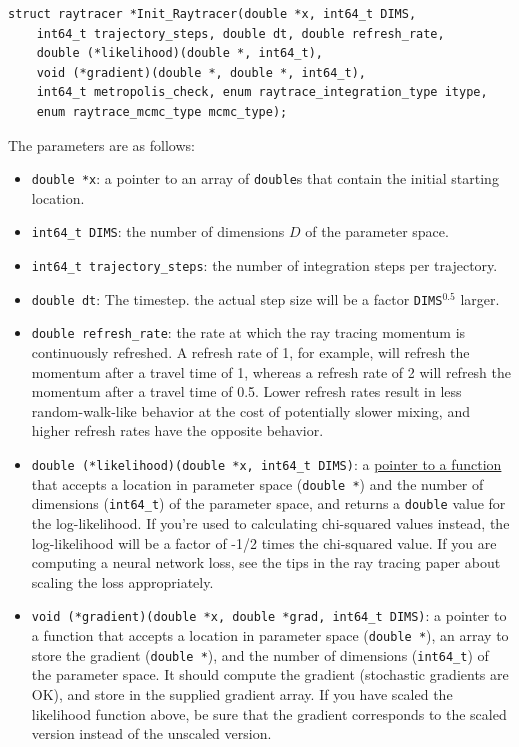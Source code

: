 \documentclass[12pt]{article}
\begin{document}
\begin{lstlisting}
struct raytracer *Init_Raytracer(double *x, int64_t DIMS, 
	int64_t trajectory_steps, double dt, double refresh_rate,
	double (*likelihood)(double *, int64_t), 
	void (*gradient)(double *, double *, int64_t),
	int64_t metropolis_check, enum raytrace_integration_type itype,
	enum raytrace_mcmc_type mcmc_type);
\end{lstlisting}
The parameters are as follows:
\begin{itemize}
\item \lstinline{double *x}: a pointer to an array of \lstinline{double}s that contain the initial starting location.
\item \lstinline{int64_t DIMS}: the number of dimensions $D$ of the parameter space.
\item \lstinline{int64_t trajectory_steps}: the number of integration steps per trajectory.
\item \lstinline{double dt}: The timestep.  the actual step size will be a factor \texttt{DIMS}$^{0.5}$ larger.
\item \lstinline{double refresh_rate}: the rate at which the ray tracing momentum is continuously refreshed.  A refresh rate of 1, for example, will refresh the momentum after a travel time of 1, whereas a refresh rate of 2 will refresh the momentum after a travel time of 0.5.  Lower refresh rates result in less random-walk-like behavior at the cost of potentially slower mixing, and higher refresh rates have the opposite behavior.
\item \lstinline{double (*likelihood)(double *x, int64_t DIMS)}: a \href{https://en.wikipedia.org/wiki/Function_pointer}{pointer to a function} that accepts a location in parameter space (\lstinline{double *}) and the number of dimensions (\lstinline{int64_t}) of the parameter space, and returns a \lstinline{double} value for the log-likelihood.  If you're used to calculating chi-squared values instead, the log-likelihood will be a factor of -1/2 times the chi-squared value.  If you are computing a neural network loss, see the tips in the ray tracing paper about scaling the loss appropriately.
\item \lstinline{void (*gradient)(double *x, double *grad, int64_t DIMS)}: a pointer to a function that accepts a location in parameter space (\lstinline{double *}), an array to store the gradient (\lstinline{double *}), and the number of dimensions (\lstinline{int64_t}) of the parameter space.  It should compute the gradient (stochastic gradients are OK), and store in the supplied gradient array.  If you have scaled the likelihood function above, be sure that the gradient corresponds to the scaled version instead of the unscaled version.

\end{itemize}
\end{document}
